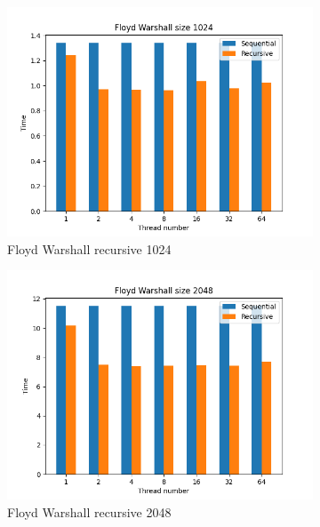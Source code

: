 \documentclass{article}
\newcommand{\eng}[1]{#1}
\begin{document}
\begin{figure}[h]
    \centering
    \begin{subfigure}{0.49\textwidth}
        \includegraphics[width=\textwidth]{a2/plots/fw_1024.png}
        \caption{\eng{Floyd Warshall} recursive 1024}
    \end{subfigure}
    \begin{subfigure}{0.49\textwidth}
        \includegraphics[width=\textwidth]{a2/plots/fw_2048.png}
        \caption{\eng{Floyd Warshall} recursive 2048}
    \end{subfigure}
    \begin{subfigure}{0.49\textwidth}

\end{subfigure}
\end{figure}
\end{document}
